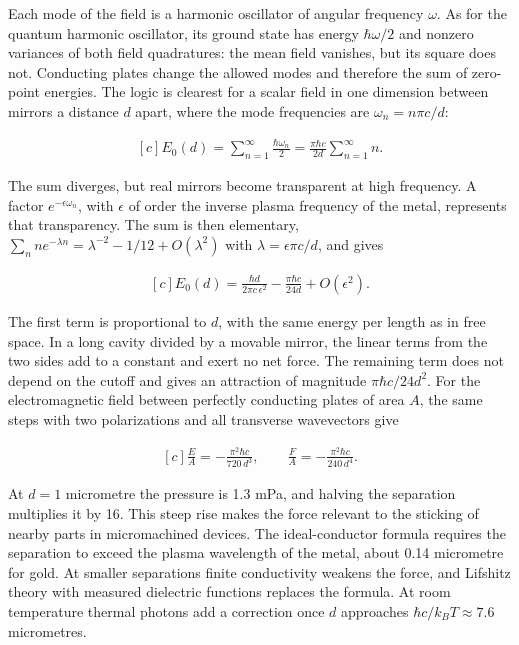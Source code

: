 \documentclass[11pt,oneside]{book}
\newenvironment{centeredalign}{\[\begin{gathered}[c]}{\end{gathered}\]}
\begin{document}
Each mode of the field is a harmonic oscillator of angular frequency \(\omega\). As for the quantum harmonic oscillator, its ground state has energy \(\hbar\omega/2\) and nonzero variances of both field quadratures: the mean field vanishes, but its square does not. Conducting plates change the allowed modes and therefore the sum of zero-point energies. The logic is clearest for a scalar field in one dimension between mirrors a distance \(d\) apart, where the mode frequencies are \(\omega_n=n\pi c/d\):

\begin{centeredalign}
E_0(d)=\sum_{n=1}^\infty\frac{\hbar\omega_n}{2}=\frac{\pi\hbar c}{2d}\sum_{n=1}^\infty n.
\end{centeredalign}

The sum diverges, but real mirrors become transparent at high frequency. A factor \(e^{-\epsilon\omega_n}\), with \(\epsilon\) of order the inverse plasma frequency of the metal, represents that transparency. The sum is then elementary, \(\sum_nne^{-\lambda n}=\lambda^{-2}-1/12+O(\lambda^2)\) with \(\lambda=\epsilon\pi c/d\), and gives

\begin{centeredalign}
E_0(d)=\frac{\hbar d}{2\pi c\,\epsilon^2}-\frac{\pi\hbar c}{24d}+O(\epsilon^2).
\end{centeredalign}

The first term is proportional to \(d\), with the same energy per length as in free space. In a long cavity divided by a movable mirror, the linear terms from the two sides add to a constant and exert no net force. The remaining term does not depend on the cutoff and gives an attraction of magnitude \(\pi\hbar c/24d^2\). For the electromagnetic field between perfectly conducting plates of area \(A\), the same steps with two polarizations and all transverse wavevectors give

\begin{centeredalign}
\frac{E}{A}=-\frac{\pi^2\hbar c}{720\,d^3},\qquad \frac{F}{A}=-\frac{\pi^2\hbar c}{240\,d^4}.
\end{centeredalign}

At \(d=1\) micrometre the pressure is 1.3 mPa, and halving the separation multiplies it by 16. This steep rise makes the force relevant to the sticking of nearby parts in micromachined devices. The ideal-conductor formula requires the separation to exceed the plasma wavelength of the metal, about 0.14 micrometre for gold. At smaller separations finite conductivity weakens the force, and Lifshitz theory with measured dielectric functions replaces the formula. At room temperature thermal photons add a correction once \(d\) approaches \(\hbar c/k_BT\approx7.6\) micrometres.
\end{document}
